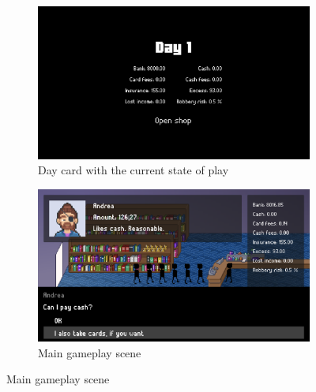 \documentclass[a4paper,11pt]{article}
\begin{document}
\begin{figure}[p]
  \vspace{\baselineskip}
  \begin{subfigure}{0.475\textwidth}
    \centering
    \includegraphics[width=\textwidth]{figures/day-card.png}
    \caption{Day card with the current state of play}\label{fig:day-card}
  \end{subfigure}
  \hfill
  \begin{subfigure}{0.475\textwidth}
    \centering
    \includegraphics[width=\textwidth]{figures/gameplay.png}
    \caption{Main gameplay scene}\label{fig:gameplay}
  \end{subfigure}


\end{figure}
\end{document}
